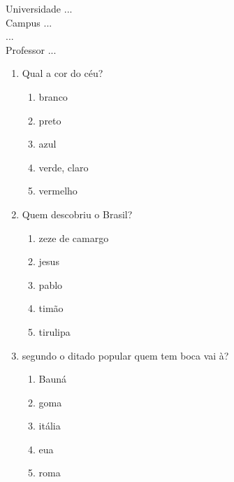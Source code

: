 \documentclass[10pt,a4paper,twocolumn]{report}
\begin{document}
\begin{flushleft}
Universidade ...\\
Campus ...\\
...\\
Professor ...\\
\end{flushleft}




 \begin{enumerate} 
    \item  Qual a cor do céu?





    \begin{enumerate}
    \item  branco

\item  preto

\item  azul

\item  verde, claro

\item  vermelho


    \end{enumerate} 
    \item  Quem descobriu o Brasil?





    \begin{enumerate}
    \item  zeze de camargo

\item  jesus

\item  pablo

\item  timão

\item  tirulipa


    \end{enumerate} 
    \item  segundo o ditado popular quem tem boca vai à?





    \begin{enumerate}
    \item  Bauná

\item  goma

\item  itália

\item  eua

\item  roma


    \end{enumerate}\end{enumerate} 
\end{document}
